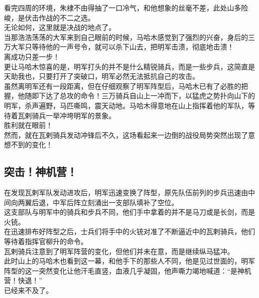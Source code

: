 \begin{multicols}{\theparacolNo}
看完四周的环境，朱棣不由得抽了一口冷气，和他想象的丝毫不差，此处山多险峻，是伏击作战的不二之选。\\

无论如何，这里就是决战的地点了。\\

当那浩浩荡荡的大军来到自己眼前的时候，马哈木感觉到了强烈的兴奋，身后的三万大军只等待他的一声号令，就可以杀下山去，把明军击溃，彻底地击溃！\\

离成功只差一步！\\

更让马哈木惊喜的是，明军打头的并不是什么精锐骑兵，而是一些步兵，这简直是天助我也，只要打开了突破口，明军必然无法抵抗自己的攻击。\\

虽然离明军还有一段距离，但在仔细观察了明军阵型后，马哈木已有了必胜的把握，他随即下达了总攻的命令！三万骑兵自山上一冲而下，以猛虎之势扑向山下的明军，杀声遍野，马匹嘶鸣，震天动地。马哈木得意地在山上指挥着他的军队，等待着瓦剌骑兵一举冲垮明军的景象。\\

胜利就在眼前！\\

然而，就在瓦剌骑兵发动冲锋后不久，这场看起来一边倒的战役局势突然出现了意想不到的变化！\\

\subsection{突击！神机营！}
在发现瓦剌军队发动进攻后，明军迅速变换了阵型，原先队伍前列的步兵迅速由中间向两翼后退，中军后阵立刻涌出一支部队填补了空位。\\

这支部队与明军中的骑兵和步兵不同，他们手中拿着的并不是马刀或是长剑，而是火铳。\\

在迅速排布好阵型之后，士兵们将手中的火铳对准了不断逼近中的瓦剌骑兵，他们等待着指挥官柳升的命令。\\

瓦剌骑兵注意到了明军阵营的变化，但他们并未在意，而是继续纵马猛冲。\\

此时山上的马哈木也看到这一幕，和他手下的那些人不同，他是见过世面的，明军阵型的这一突然变化让他汗毛直竖，血液几乎凝固，他声嘶力竭地喊道：“是神机营！快退！”\\

已经来不及了。\\


\end{multicols}
